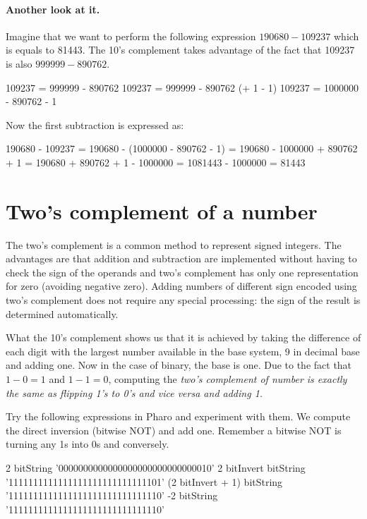 \documentclass[a4paper,10pt,twoside]{book}
\begin{document}
\paragraph{Another look at it.} 
Imagine that we want to perform the following expression $190680 - 109237$ which is equals to 81443.
The 10's complement takes advantage of the fact that 109237 is also $999999 - 890762$.

\begin{code}{}
109237 = 999999 - 890762
109237 = 999999 - 890762 (+ 1 - 1)
109237 = 1000000 - 890762 - 1
\end{code}

Now the first subtraction is expressed as:
\begin{code}{}
190680 - 109237
= 190680 - (1000000 - 890762 - 1)
= 190680 - 1000000 + 890762 + 1
= 190680  + 890762 + 1 - 1000000
= 1081443 - 1000000
= 81443
\end{code}


\section{Two's complement of a number}

The two's complement is a common method to represent signed integers. The advantages are that addition and subtraction are implemented without having to  check the sign of the operands and two's complement has only one representation for zero (avoiding negative zero). Adding numbers of different sign encoded using two's complement does not  require any special processing: the sign of the result is determined automatically. 

What the 10's complement shows us  that it is achieved by taking the difference of each digit with the largest number available in the base system, 9 in decimal base and adding one. Now in the case of binary, the base is one.
Due to the fact that $1 - 0 = 1$ and $1 - 1 = 0$, computing the \emph{two's complement of number is exactly the same as flipping 1's to 0's and vice versa and adding 1.}


Try the following expressions in Pharo and experiment with them. We compute the direct inversion (bitwise NOT) and add one. 
Remember a bitwise NOT is turning any 1s into 0s and conversely. 

\begin{code}{}
2 bitString 
			'0000000000000000000000000000010'
2 bitInvert bitString 
			'1111111111111111111111111111101'
(2 bitInvert + 1) bitString 
			'1111111111111111111111111111110'
-2 bitString 
			'1111111111111111111111111111110'		 
\end{code}
\end{document}
